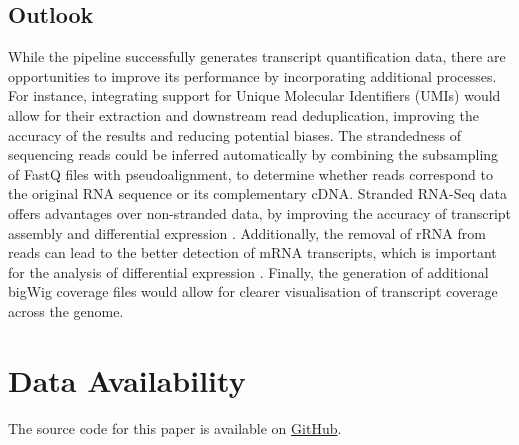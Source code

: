 \documentclass[12pt]{article}
\begin{document}
\subsection{Outlook}
While the pipeline successfully generates transcript quantification data, there are opportunities to improve its performance by incorporating additional processes. For instance, integrating support for Unique Molecular Identifiers (UMIs) would allow for their extraction and downstream read deduplication, improving the accuracy of the results and reducing potential biases. The strandedness of sequencing reads could be inferred automatically by combining the subsampling of FastQ files with pseudoalignment, to determine whether reads correspond to the original RNA sequence or its complementary cDNA. Stranded RNA-Seq data offers advantages over non-stranded data, by improving the accuracy of transcript assembly and differential expression \cite{Signal2022}. Additionally, the removal of rRNA from reads can lead to the better detection of mRNA transcripts, which is important for the analysis of differential expression \cite{Pastor2022}. Finally, the generation of additional bigWig coverage files would allow for clearer visualisation of transcript coverage across the genome.

\section*{Data Availability}
The source code for this paper is available on \href{{https://github.com/JuliaGraf/RNAseq}}{GitHub}.

\newpage


\end{document}
